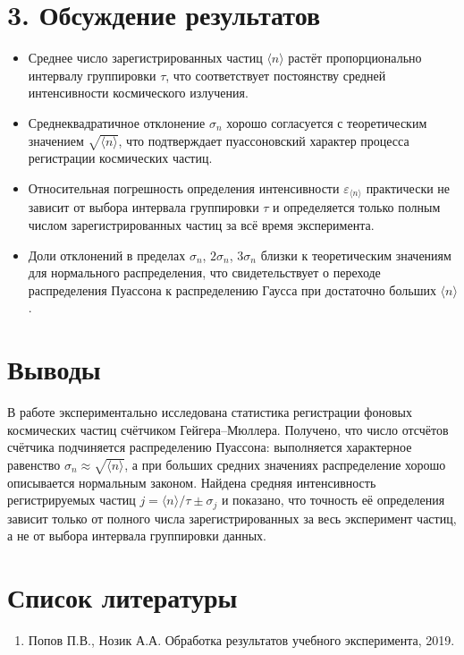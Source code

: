 \documentclass[12pt,a4paper]{article}
\begin{document}
\section*{3. Обсуждение результатов}

\begin{itemize}
    \item Среднее число зарегистрированных частиц $\langle n\rangle$ растёт пропорционально интервалу группировки $\tau$, что соответствует постоянству средней интенсивности космического излучения.
    \item Среднеквадратичное отклонение $\sigma_n$ хорошо согласуется с теоретическим значением $\sqrt{\langle n\rangle}$, что подтверждает пуассоновский характер процесса регистрации космических частиц.
    \item Относительная погрешность определения интенсивности $\varepsilon_{\langle n\rangle}$ практически не зависит от выбора интервала группировки $\tau$ и определяется только полным числом зарегистрированных частиц за всё время эксперимента.
    \item Доли отклонений в пределах $\sigma_n$, $2\sigma_n$, $3\sigma_n$ близки к теоретическим значениям для нормального распределения, что свидетельствует о переходе распределения Пуассона к распределению Гаусса при достаточно больших $\langle n\rangle$.
\end{itemize}

\section*{Выводы}

В работе экспериментально исследована статистика регистрации фоновых космических частиц счётчиком Гейгера--Мюллера. Получено, что число отсчётов счётчика подчиняется распределению Пуассона: выполняется характерное равенство $\sigma_n\approx\sqrt{\langle n\rangle}$, а при больших средних значениях распределение хорошо описывается нормальным законом. Найдена средняя интенсивность регистрируемых частиц $j = \langle n\rangle/\tau \pm \sigma_j$ и показано, что точность её определения зависит только от полного числа зарегистрированных за весь эксперимент частиц, а не от выбора интервала группировки данных.

\section*{Список литературы}

\begin{enumerate}
    \item Попов П.В., Нозик А.А. Обработка результатов учебного эксперимента, 2019.
\end{enumerate}
\end{document}

